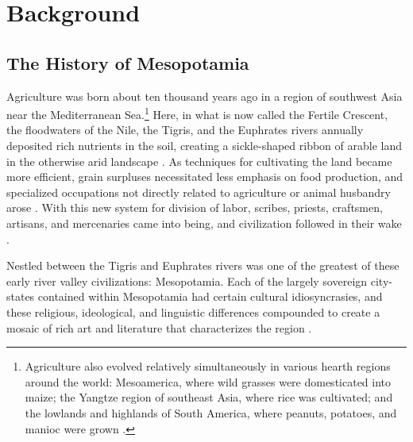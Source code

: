 \documentclass[10pt,a4paper]{article}
\begin{document}
\section{Background}
\subsection{The History of Mesopotamia}
%
%
Agriculture was born about ten thousand years ago in a region of southwest Asia near the Mediterranean Sea.\footnote{Agriculture also evolved relatively simultaneously in various hearth regions around the world: Mesoamerica, where wild grasses were domesticated into maize; the Yangtze region of southeast Asia, where rice was cultivated; and the lowlands and highlands of South America, where peanuts, potatoes, and manioc were grown \cite{brown2009complex}.} Here, in what is now called the Fertile Crescent, the floodwaters of the Nile, the Tigris, and the Euphrates rivers annually deposited rich nutrients in the soil, creating a sickle-shaped ribbon of arable land in the otherwise arid landscape \cite{nelson2015}. As techniques for cultivating the land became more efficient, grain surpluses necessitated less emphasis on food production, and specialized occupations not directly related to agriculture or animal husbandry arose \cite{brown2009complex}. With this new system for division of labor, scribes, priests, craftsmen, artisans, and mercenaries came into being, and civilization followed in their wake \cite{nelson2015}. 

Nestled between the Tigris and Euphrates rivers was one of the greatest of these early river valley civilizations: Mesopotamia. Each of the largely sovereign city-states contained within Mesopotamia had certain cultural idiosyncrasies, and these religious, ideological, and linguistic differences compounded to create a mosaic of rich art and literature that characterizes the region \cite{van1997ancient}. 
\end{document}
